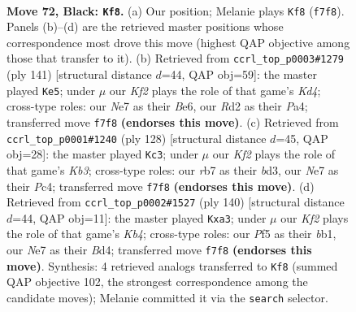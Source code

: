 \documentclass[11pt]{article}
\begin{document}
\clearpage

\begin{figure}[p]\centering
\begin{subfigure}{0.46\textwidth}\centering
\resizebox{\linewidth}{!}{%
\newchessgame
\chessboard[
  setfen={8/pR2nk2/P6R/1P3p2/b4P2/8/3r4/4b1K1 b - - 0 72},
  showmover=false,
  pgfstyle=straightmove, color=movearrow, markmove={f7-f8}
]}
\caption{}
\end{subfigure}\hfill
\begin{subfigure}{0.46\textwidth}\centering
\resizebox{\linewidth}{!}{%
\newchessgame
\chessboard[
  setfen={8/5p1p/4b2R/3k2P1/p1r5/K1P3R1/8/8 b - - 60 71},
  showmover=false,
  pgfstyle=straightmove, color=movearrow, markmove={d5-e5}
]}
\caption{}
\end{subfigure}
\\[4pt]
\begin{subfigure}{0.46\textwidth}\centering
\resizebox{\linewidth}{!}{%
\newchessgame
\chessboard[
  setfen={2k5/2p2R2/p3r3/P7/2PB4/1K1bP3/8/8 w - - 27 65},
  showmover=false,
  pgfstyle=straightmove, color=movearrow, markmove={b3-c3}
]}
\caption{}
\end{subfigure}\hfill
\begin{subfigure}{0.46\textwidth}\centering
\resizebox{\linewidth}{!}{%
\newchessgame
\chessboard[
  setfen={8/1k6/8/P2r1p2/1K1BpP2/p3P3/7R/1b6 w - - 2 71},
  showmover=false,
  pgfstyle=straightmove, color=movearrow, markmove={b4-a3}
]}
\caption{}
\end{subfigure}
\caption{\textbf{Move 72, Black: \texttt{Kf8}.} (a) Our position; Melanie plays \texttt{Kf8} (\texttt{f7f8}). Panels (b)--(d) are the retrieved master positions whose correspondence most drove this move (highest QAP objective among those that transfer to it). (b) Retrieved from \texttt{ccrl\_top\_p0003\#1279} (ply 141) [structural distance $d$=44, QAP obj=59]: the master played \texttt{Ke5}; under $\mu$ our \emph{Kf2} plays the role of that game's \emph{Kd4}; cross-type roles: our \emph{N}e7 as their \emph{B}e6, our \emph{R}d2 as their \emph{P}a4; transferred move \texttt{f7f8} \textbf{(endorses this move)}. (c) Retrieved from \texttt{ccrl\_top\_p0001\#1240} (ply 128) [structural distance $d$=45, QAP obj=28]: the master played \texttt{Kc3}; under $\mu$ our \emph{Kf2} plays the role of that game's \emph{Kb3}; cross-type roles: our \emph{r}b7 as their \emph{b}d3, our \emph{N}e7 as their \emph{P}c4; transferred move \texttt{f7f8} \textbf{(endorses this move)}. (d) Retrieved from \texttt{ccrl\_top\_p0002\#1527} (ply 140) [structural distance $d$=44, QAP obj=11]: the master played \texttt{Kxa3}; under $\mu$ our \emph{Kf2} plays the role of that game's \emph{Kb4}; cross-type roles: our \emph{P}f5 as their \emph{b}b1, our \emph{N}e7 as their \emph{B}d4; transferred move \texttt{f7f8} \textbf{(endorses this move)}. Synthesis: 4 retrieved analogs transferred to \texttt{Kf8} (summed QAP objective 102, the strongest correspondence among the candidate moves); Melanie committed it via the \texttt{search} selector.}
\label{fig:thought-m143}
\end{figure}
\end{document}
